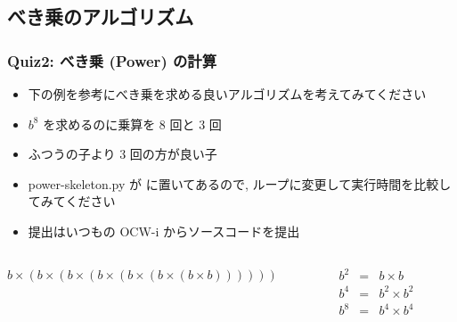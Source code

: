 \subsection{べき乗のアルゴリズム}
\begin{frame}
\frametitle{Quiz2: べき乗 (Power) の計算}
  \begin{itemize}
\item 下の例を参考にべき乗を求める良いアルゴリズムを考えてみてください
\item \(b^8\) を求めるのに乗算を 8 回と 3 回
\item ふつうの子より 3 回の方が良い子
\item power-skeleton.py が\href{https://sites.google.com/a/presystems.xyz/sample/home/elementary-computer-science}{} に置いてあるので,
ループに変更して実行時間を比較してみてください
\item 提出はいつもの OCW-i からソースコードを提出
  \end{itemize}
  \begin{example}[\(b^8\) の計算]
  \begin{columns}[t]
    \begin{column}{0.55\textwidth}
\(b\times(b\times(b\times(b\times(b\times(b\times(b\times b))))))\)
    \end{column}
    \begin{column}{0.35\textwidth}
\centering
      \begin{math}
        \begin{array}{rcl}
b^2 &=& b \times b\\
b^4 &=& b^2 \times b^2\\
b^8 &=& b^4 \times b^4
        \end{array}
      \end{math}
    \end{column}
  \end{columns}
  \end{example}
\end{frame}
